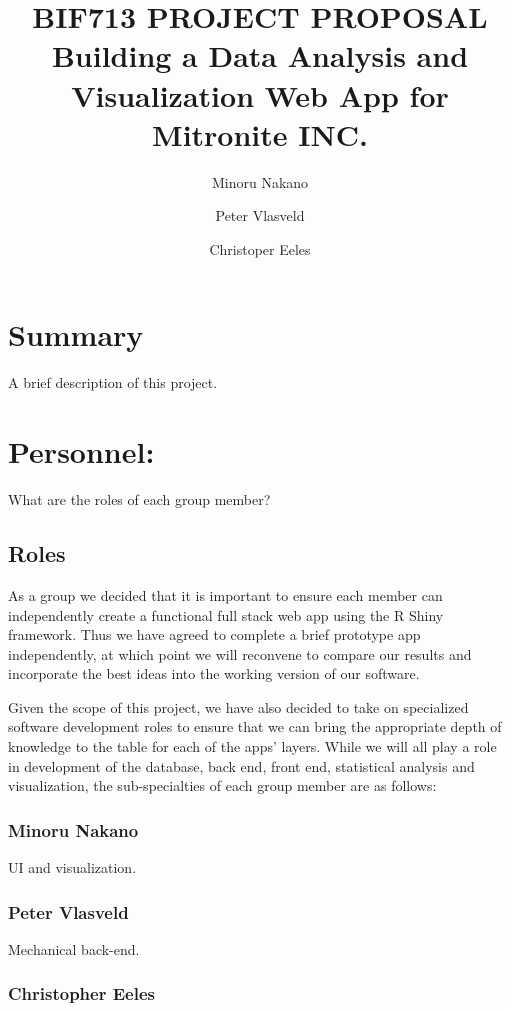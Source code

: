 \documentclass[10pt,twocolumn,letterpaper]{article}
\title{
		\usefont{OT1}{bch}{b}{n}
		\normalfont \normalsize \textsc{BIF713 PROJECT PROPOSAL} \\ [14pt]
		\huge Building a Data Analysis and Visualization Web App for Mitronite INC. \\
}
\author{Minoru Nakano}
\author{Peter Vlasveld}
\author{Christoper Eeles}
\begin{document}
\maketitle


\section*{Summary}
A brief description of this project.

\section{Personnel:}
    	
    	What are the roles of each group member?

            \subsection{Roles}

            As a group we decided that it is important to ensure each member can independently create a functional full stack web app using the R Shiny framework. Thus we have agreed to complete a brief prototype app independently, at which point we will reconvene to compare our results and incorporate the best ideas into the working version of our software.

            Given the scope of this project, we have also decided to take on specialized software development roles to ensure that we can bring the appropriate depth of knowledge to the table for each of the apps' layers. While we will all play a role in development of the database, back end, front end, statistical analysis and visualization, the sub-specialties of each group member are as follows:

                \subsubsection*{Minoru Nakano}

                UI and visualization.

                \subsubsection*{Peter Vlasveld}

                Mechanical back-end.

                \subsubsection*{Christopher Eeles}
\end{document}

